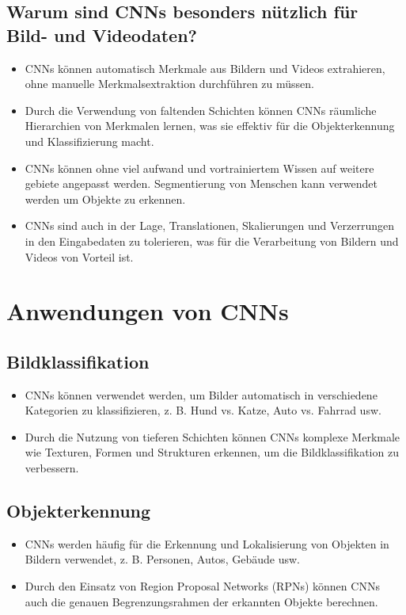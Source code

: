 \subsection{Warum sind CNNs besonders nützlich für Bild- und Videodaten?}
\begin{itemize}
  \item CNNs können automatisch Merkmale aus Bildern und Videos extrahieren, ohne manuelle Merkmalsextraktion durchführen zu müssen.
  \item Durch die Verwendung von faltenden Schichten können CNNs räumliche Hierarchien von Merkmalen lernen, was sie effektiv für die Objekterkennung und Klassifizierung macht.
  \item CNNs können ohne viel aufwand und vortrainiertem Wissen auf weitere gebiete angepasst werden. Segmentierung von Menschen kann verwendet werden um Objekte zu erkennen.
  \item CNNs sind auch in der Lage, Translationen, Skalierungen und Verzerrungen in den Eingabedaten zu tolerieren, was für die Verarbeitung von Bildern und Videos von Vorteil ist.
\end{itemize}

\section{Anwendungen von CNNs}

\subsection{Bildklassifikation}
\begin{itemize}
  \item CNNs können verwendet werden, um Bilder automatisch in verschiedene Kategorien zu klassifizieren, z. B. Hund vs. Katze, Auto vs. Fahrrad usw.
  \item Durch die Nutzung von tieferen Schichten können CNNs komplexe Merkmale wie Texturen, Formen und Strukturen erkennen, um die Bildklassifikation zu verbessern.
\end{itemize}

\subsection{Objekterkennung}
\begin{itemize}
  \item CNNs werden häufig für die Erkennung und Lokalisierung von Objekten in Bildern verwendet, z. B. Personen, Autos, Gebäude usw.
  \item Durch den Einsatz von Region Proposal Networks (RPNs) können CNNs auch die genauen Begrenzungsrahmen der erkannten Objekte berechnen.
\end{itemize}

